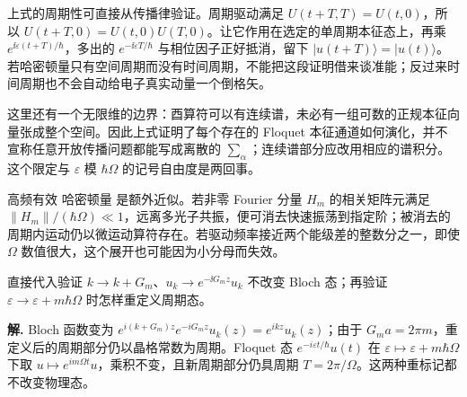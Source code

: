 上式的周期性可直接从传播律验证。周期驱动满足 \(U(t+T,T)=U(t,0)\)，所以 \(U(t+T,0)=U(t,0)U(T,0)\)。让它作用在选定的单周期本征态上，再乘 \(e^{\ii\varepsilon(t+T)/\hbar}\)，多出的 \(e^{-\ii\varepsilon T/\hbar}\) 与相位因子正好抵消，留下 \(|u(t+T)\rangle=|u(t)\rangle\)。若哈密顿量只有空间周期而没有时间周期，不能把这段证明借来谈准能；反过来时间周期也不会自动给电子真实动量一个倒格矢。

这里还有一个无限维的边界：酉算符可以有连续谱，未必有一组可数的正规本征向量张成整个空间。因此上式证明了每个存在的 Floquet 本征通道如何演化，并不宣称任意开放传播问题都能写成离散的 \(\sum_\alpha\)；连续谱部分应改用相应的谱积分。这个限定与 \(\varepsilon\) 模 \(\hbar\Omega\) 的记号自由度是两回事。

高频有效 哈密顿量 是额外近似。若非零 Fourier 分量 \(H_m\) 的相关矩阵元满足 \(\|H_m\|/(\hbar\Omega)\ll1\)，远离多光子共振，便可消去快速振荡到指定阶；被消去的周期内运动仍以微运动算符存在。若驱动频率接近两个能级差的整数分之一，即使 \(\Omega\) 数值很大，这个展开也可能因为小分母而失效。



\par
\begin{workedexample}
直接代入验证 \(k\to k+G_m\)、\(u_k\to e^{-\ii G_mz}u_k\) 不改变 Bloch 态；再验证 \(\varepsilon\to\varepsilon+m\hbar\Omega\) 时怎样重定义周期态。

\textbf{解.} Bloch 函数变为 \(e^{i(k+G_m)z}e^{-iG_mz}u_k(z)=e^{ikz}u_k(z)\)；由于 \(G_ma=2\pi m\)，重定义后的周期部分仍以晶格常数为周期。Floquet 态 \(e^{-i\varepsilon t/\hbar}u(t)\) 在 \(\varepsilon\mapsto\varepsilon+m\hbar\Omega\) 下取 \(u\mapsto e^{im\Omega t}u\)，乘积不变，且新周期部分仍具周期 \(T=2\pi/\Omega\)。这两种重标记都不改变物理态。
\end{workedexample}
\par
